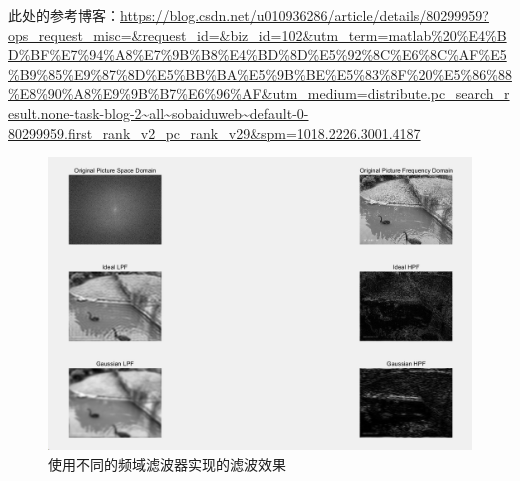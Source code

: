 \documentclass[UTF8]{article} %
\begin{document}
	此处的参考博客：\url{https://blog.csdn.net/u010936286/article/details/80299959?ops_request_misc=&request_id=&biz_id=102&utm_term=matlab%20%E4%BD%BF%E7%94%A8%E7%9B%B8%E4%BD%8D%E5%92%8C%E6%8C%AF%E5%B9%85%E9%87%8D%E5%BB%BA%E5%9B%BE%E5%83%8F%20%E5%86%88%E8%90%A8%E9%9B%B7%E6%96%AF&utm_medium=distribute.pc_search_result.none-task-blog-2~all~sobaiduweb~default-0-80299959.first_rank_v2_pc_rank_v29&spm=1018.2226.3001.4187}
	\begin{figure}[H]
		\centering
		\includegraphics[width=0.85\linewidth]{screenshot011}
		\caption{使用不同的频域滤波器实现的滤波效果}
		\label{fig:3-4}
	\end{figure}
	
\end{document}

